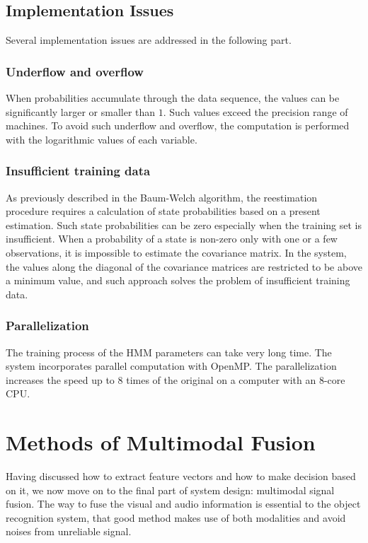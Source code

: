 \documentclass[letterpaper, 10 pt, conference]{ieeeconf}  %
\begin{document}
\subsection{Implementation Issues}
Several implementation issues are addressed in the following part.

\subsubsection{Underflow and overflow}

When probabilities accumulate through the data sequence, the values can be significantly larger or smaller than $1$. Such values exceed the precision range of machines. To avoid such underflow and overflow, the computation is performed with the logarithmic values of each variable. 

\subsubsection{Insufficient training data}

As previously described in the Baum-Welch algorithm, the reestimation procedure requires a calculation of state probabilities based on a present estimation. Such state probabilities can be zero especially when the training set is insufficient. When a probability of a state is non-zero only with one or a few observations, it is impossible to estimate the covariance matrix. In the system, the values along the diagonal of the covariance matrices are restricted to be above a minimum value, and such approach solves the problem of insufficient training data. 

\subsubsection{Parallelization}

The training process of the HMM parameters can take very long time. The system incorporates parallel computation with OpenMP. The parallelization increases the speed up to 8 times of the original on a computer with an 8-core CPU.

\section{Methods of Multimodal Fusion}
Having discussed how to extract feature vectors and how to make decision based on it, we now move on to the final part of system design: multimodal signal fusion. The way to fuse the visual and audio information is essential to the object recognition system, that good method makes use of both modalities and avoid noises from unreliable signal.
\end{document}

